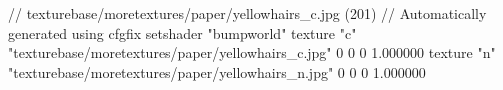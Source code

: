 // texturebase/moretextures/paper/yellowhairs_c.jpg (201)
// Automatically generated using cfgfix
setshader "bumpworld"
texture "c" "texturebase/moretextures/paper/yellowhairs_c.jpg" 0 0 0 1.000000
texture "n" "texturebase/moretextures/paper/yellowhairs_n.jpg" 0 0 0 1.000000
